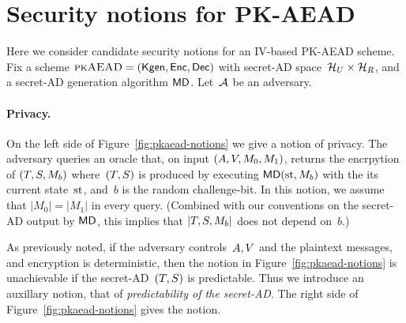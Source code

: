 
\section{Security notions for PK-AEAD} 
Here we consider candidate security notions for an IV-based PK-AEAD scheme.  Fix a scheme $\textsc{pkAEAD}=(\mathsf{Kgen},{\mathsf{Enc}},{\mathsf{Dec}})$ with secret-AD space~$\mathcal{H}_U \times \mathcal{H}_R$, and a secret-AD generation algorithm $\mathsf{MD}$.  Let~${\cal A}$ be an adversary.  

\paragraph{Privacy. }
On the left side of Figure~\ref{fig:pkaead-notions} we give a notion of privacy.  The adversary queries an oracle that, on input $(A,V,M_0,M_1)$, returns the encrpytion of $(T,S,M_b)$ where~$(T,S)$ is produced by executing $\mathsf{MD}(\mathrm{st},M_b)$ with the its current state~$\mathrm{st}$, and~$b$ is the random challenge-bit.  In this notion, we assume that $|M_0|=|M_1|$ in every query.  (Combined with our conventions on the secret-AD output by $\mathsf{MD}$, this implies that $|T,S,M_b|$ does not depend on~$b$.)

As previously noted, if the adversary controls~$A, V$ and the plaintext messages, and encryption is deterministic, then the notion in Figure~\ref{fig:pkaead-notions} is unachievable if the secret-AD~$(T,S)$ is predictable. Thus we introduce an auxillary notion, that of \textit{predictability of the secret-AD}.  The right side of Figure~\ref{fig:pkaead-notions} gives the notion.

